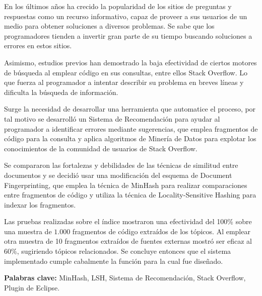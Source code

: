 \begin{resumen}
En los \'ultimos a\~nos ha crecido la popularidad de los sitios de preguntas y respuestas como un recurso informativo,
capaz de proveer a sus usuarios de un medio para obtener soluciones a diversos problemas.
Se sabe que los programadores tienden a invertir gran parte de su tiempo buscando soluciones a errores en estos sitios.

Asimismo, estudios previos han demostrado la baja efectividad de ciertos
motores de b\'usqueda al emplear c\'odigo en sus consultas, entre ellos Stack Overflow.
Lo que fuerza al programador a intentar describir su problema en breves l\'ineas
y dificulta la b\'usqueda de informaci\'on. 

Surge la necesidad de desarrollar una herramienta que automatice el proceso,
por tal motivo se desarroll\'o un Sistema de Recomendaci\'on para ayudar al programador a identificar errores mediante sugerencias,
que emplea fragmentos de c\'odigo para la consulta y 
aplica algoritmos de Miner\'ia de Datos para explotar los conocimientos de la comunidad de usuarios de Stack Overflow.

Se compararon las fortalezas y debilidades de las t\'ecnicas de similitud entre documentos
y se decidi\'o usar una modificaci\'on del esquema de Document Fingerprinting,
que emplea la t\'ecnica de MinHash para realizar comparaciones entre fragmentos de c\'odigo
y utiliza la t\'ecnica de Locality-Sensitive Hashing para indexar los fragmentos.

Las pruebas realizadas sobre el \'indice mostraron una efectividad del 100\%
sobre una muestra de $1.000$ fragmentos de c\'odigo extra\'idos de los t\'opicos.
Al emplear otra muestra de 10 fragmentos extra\'idos de fuentes externas mostr\'o ser eficaz al 60\%,
sugiriendo t\'opicos relacionados. Se concluye entonces que el sistema
implementado cumple cabalmente la funci\'on para la cual fue dise\~nado.

\vfill
\textbf{Palabras clave:} MinHash, LSH, Sistema de Recomendación, Stack Overflow, Plugin de Eclipse.
\end{resumen}